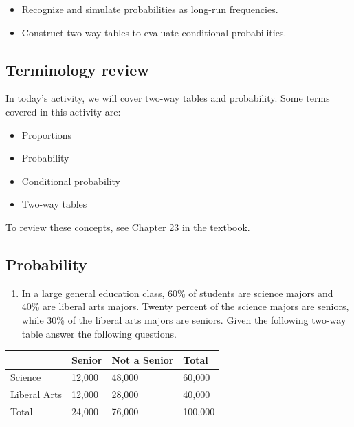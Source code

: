 \documentclass[
]{report}
\providecommand{\tightlist}{%
  \setlength{\itemsep}{0pt}\setlength{\parskip}{0pt}}
\begin{document}
\begin{itemize}
\item
  Recognize and simulate probabilities as long-run frequencies.
\item
  Construct two-way tables to evaluate conditional probabilities.
\end{itemize}

\hypertarget{terminology-review-23}{%
\subsection{Terminology review}\label{terminology-review-23}}

In today's activity, we will cover two-way tables and probability. Some terms covered in this activity are:

\begin{itemize}
\item
  Proportions
\item
  Probability
\item
  Conditional probability
\item
  Two-way tables
\end{itemize}

To review these concepts, see Chapter 23 in the textbook.

\hypertarget{probability}{%
\subsection{Probability}\label{probability}}

\begin{enumerate}
\def\labelenumi{\arabic{enumi}.}
\tightlist
\item
  In a large general education class, 60\% of students are science majors and 40\% are liberal arts majors. Twenty percent of the science majors are seniors, while 30\% of the liberal arts majors are seniors. Given the following two-way table answer the following questions.
\end{enumerate}

\begin{longtable}[]{@{}llll@{}}
\toprule()
& Senior & Not a Senior & Total \\
\midrule()
\endhead
Science & 12,000 & 48,000 & 60,000 \\
Liberal Arts & 12,000 & 28,000 & 40,000 \\
Total & 24,000 & 76,000 & 100,000 \\
\bottomrule()
\end{longtable}
\end{document}
